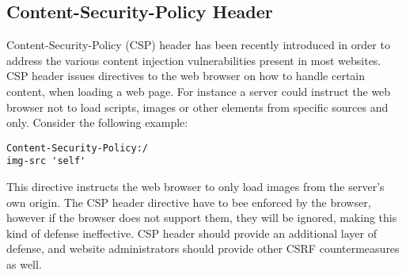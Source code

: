 \subsection{Content-Security-Policy Header}
Content-Security-Policy (CSP) header has been recently introduced in order to address the various content injection vulnerabilities
present in most websites.  CSP header issues directives to the web browser on how to handle certain content, when loading
a web page.  For instance a server could instruct the web browser not to load scripts, images or other elements from
specific sources and only. Consider the following example:
\begin{lstlisting}
Content-Security-Policy:/
img-src 'self'
\end{lstlisting}
This directive instructs the web browser to only load images from the server's own origin.  The CSP header directive 
have to bee enforced by the browser, however if the browser does not support them, they will be ignored, making this 
kind of defense ineffective.  CSP header should provide an additional layer of defense, and website administrators
should provide other CSRF countermeasures as well.
